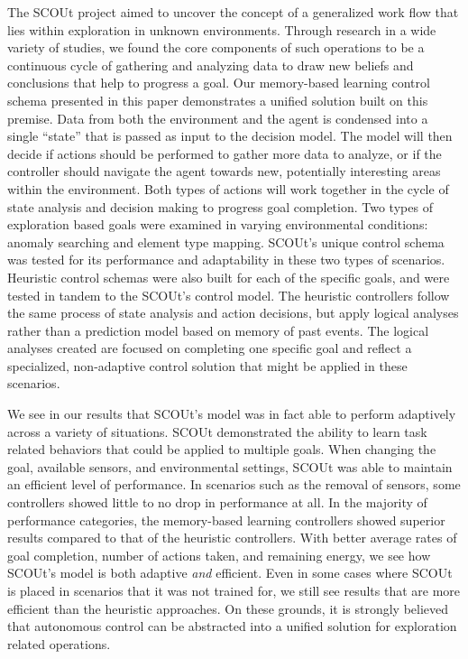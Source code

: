 The SCOUt project aimed to uncover the concept of a generalized work flow that lies within exploration in unknown environments.
Through research in a wide variety of studies, we found the core components of such operations to be a continuous cycle of gathering and analyzing data to draw new beliefs and conclusions that help to progress a goal.
Our memory-based learning control schema presented in this paper demonstrates a unified solution built on this premise.
Data from both the environment and the agent is condensed into a single ``state'' that is passed as input to the decision model.
The model will then decide if actions should be performed to gather more data to analyze, or if the controller should navigate the agent towards new, potentially interesting areas within the environment.
Both types of actions will work together in the cycle of state analysis and decision making to progress goal completion.
Two types of exploration based goals were examined in varying environmental conditions: anomaly searching and element type mapping.
SCOUt's unique control schema was tested for its performance and adaptability in these two types of scenarios.
Heuristic control schemas were also built for each of the specific goals, and were tested in tandem to the SCOUt's control model.
The heuristic controllers follow the same process of state analysis and action decisions, but apply logical analyses rather than a prediction model based on memory of past events.
The logical analyses created are focused on completing one specific goal and reflect a specialized, non-adaptive control solution that might be applied in these scenarios.

We see in our results that SCOUt's model was in fact able to perform adaptively across a variety of situations.
SCOUt demonstrated the ability to learn task related behaviors that could be applied to multiple goals.
When changing the goal, available sensors, and environmental settings, SCOUt was able to maintain an efficient level of performance.
In scenarios such as the removal of sensors, some controllers showed little to no drop in performance at all.
In the majority of performance categories, the memory-based learning controllers showed superior results compared to that of the heuristic controllers.
With better average rates of goal completion, number of actions taken, and remaining energy, we see how SCOUt's model is both adaptive \textit{and} efficient.
Even in some cases where SCOUt is placed in scenarios that it was not trained for, we still see results that are more efficient than the heuristic approaches.
On these grounds, it is strongly believed that autonomous control can be abstracted into a unified solution for exploration related operations.

